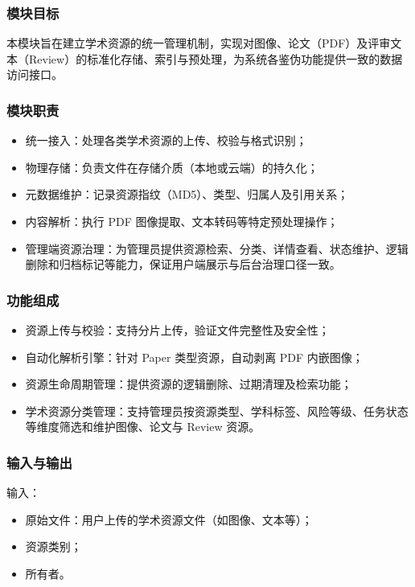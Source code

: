 \subsubsection{模块目标}
本模块旨在建立学术资源的统一管理机制，实现对图像、论文（PDF）及评审文本（Review）的标准化存储、索引与预处理，为系统各鉴伪功能提供一致的数据访问接口。

\subsubsection{模块职责}
\begin{itemize}[leftmargin=2em]
    \item 统一接入：处理各类学术资源的上传、校验与格式识别；
    \item 物理存储：负责文件在存储介质（本地或云端）的持久化；
    \item 元数据维护：记录资源指纹（MD5）、类型、归属人及引用关系；
    \item 内容解析：执行 PDF 图像提取、文本转码等特定预处理操作；
    \item 管理端资源治理：为管理员提供资源检索、分类、详情查看、状态维护、逻辑删除和归档标记等能力，保证用户端展示与后台治理口径一致。
\end{itemize}

\subsubsection{功能组成}
\begin{itemize}[leftmargin=2em]
    \item 资源上传与校验：支持分片上传，验证文件完整性及安全性；
    \item 自动化解析引擎：针对 Paper 类型资源，自动剥离 PDF 内嵌图像；
    \item 资源生命周期管理：提供资源的逻辑删除、过期清理及检索功能；
    \item 学术资源分类管理：支持管理员按资源类型、学科标签、风险等级、任务状态等维度筛选和维护图像、论文与 Review 资源。
\end{itemize}

\subsubsection{输入与输出}
输入：
\begin{itemize}[leftmargin=2em]
    \item 原始文件：用户上传的学术资源文件（如图像、文本等）；
    \item 资源类别；
    \item 所有者。
\end{itemize}

